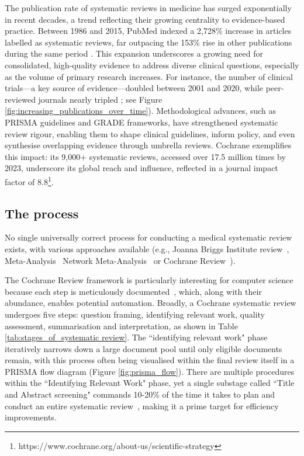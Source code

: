 \documentclass[10pt,oneside]{book}
\begin{document}
The publication rate of systematic reviews in medicine has surged exponentially in recent decades, a trend reflecting their growing centrality to evidence-based practice. Between 1986 and 2015, PubMed indexed a 2,728\% increase in articles labelled as systematic reviews, far outpacing the 153\% rise in other publications during the same period \cite{ioannidis_mass_2016}. This expansion underscores a growing need for consolidated, high-quality evidence to address diverse clinical questions, especially as the volume of primary research increases. For instance, the number of clinical trials—a key source of evidence—doubled between 2001 and 2020, while peer-reviewed journals nearly tripled \cite{ghasemi_scientific_2022}; see Figure \ref{fig:increasing_publications_over_time}). Methodological advances, such as PRISMA guidelines and GRADE frameworks, have strengthened systematic review rigour, enabling them to shape clinical guidelines, inform policy, and even synthesise overlapping evidence through umbrella reviews. Cochrane exemplifies this impact: its 9,000+ systematic reviews, accessed over 17.5 million times by 2023, underscore its global reach and influence, reflected in a journal impact factor of 8.8\footnote{https://www.cochrane.org/about-us/scientific-strategy}.


\subsection{The process}

No single universally correct process for conducting a medical systematic review exists, with various approaches available (e.g., Joanna Briggs Institute review~\cite{santos_joanna_2018}, Meta-Analysis~\cite{moher_improving_1999} Network Meta-Analysis~\cite{bafeta_reporting_2014} or Cochrane Review~\cite{cipriani_what_2011, munn_what_2018}). 

The Cochrane Review framework is particularly interesting for computer science because each step is meticulously documented~\cite{guyatt_grade_2008, cumpston_chapter_2024}, which, along with their abundance, enables potential automation. Broadly, a Cochrane systematic review undergoes five steps: question framing, identifying relevant work, quality assessment, summarisation and interpretation, as shown in Table \ref{tab:stages_of_systematic review}. The ``identifying relevant work" phase iteratively narrows down a large document pool until only eligible documents remain, with this process often being visualised within the final review itself in a PRISMA flow diagram (Figure \ref{fig:prisma_flow}). There are multiple procedures within the ``Identifying Relevant Work" phase, yet a single substage called ``Title and Abstract screening" commands 10-20\% of the time it takes to plan and conduct an entire systematic review~\cite{haddaway_predicting_2019}, making it a prime target for efficiency improvements. 
\end{document}
